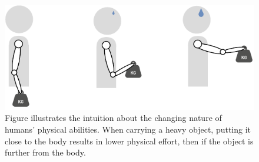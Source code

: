 

\begin{figure}[!h]
    \centering
    \includegraphics[width=0.8\linewidth]{Chapters/imgs/baguette_carrying.pdf}
    \caption{Figure illustrates the intuition about the changing nature of humans' physical abilities. When carrying a heavy object, putting it close to the body results in lower physical effort, then if the object is further from the body. }
    \label{fig:baguette}
\end{figure}


